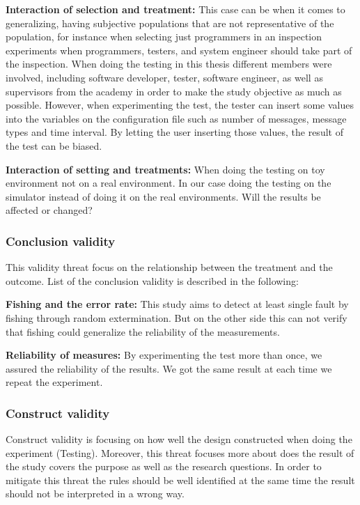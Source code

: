 \textbf{Interaction of selection and treatment:} 
This case can be when it comes to generalizing, having subjective populations that are not representative of the population, for instance when selecting just  programmers in an inspection experiments when programmers, testers, and system engineer should take part of the inspection. When doing the testing in this thesis different members were involved, including software developer, tester, software engineer, as well as supervisors from the academy in order to make the study objective as much as possible. However, when experimenting the test, the tester can insert some values into the variables on the configuration file such as number of messages, message types and time interval. By letting the user inserting those values, the result of the test can be biased. 

\textbf{Interaction of setting and treatments:}
When doing the testing on toy environment not on a real environment. In our case doing the testing on the simulator instead of doing it on the real environments. Will the results be affected or changed?  

\subsubsection{Conclusion validity}
This validity threat focus on the relationship between the treatment and the outcome. List of the conclusion validity is described in the following:

\textbf{Fishing and the error rate:}
This study aims to detect at least single fault by fishing through random extermination. But on the other side this can not verify that fishing could generalize the reliability of the measurements.  

\textbf{Reliability of measures:}
By experimenting the test more than once, we assured the reliability of the results. We got the same result at each time we repeat the experiment. 


\subsubsection{Construct validity}
Construct validity is focusing on how well the design constructed when doing the experiment (Testing). Moreover, this threat focuses more about does the result of the study covers the purpose as well as the research questions. In order to mitigate this threat the rules should be well identified at the same time the result should not be interpreted in a wrong way. 

